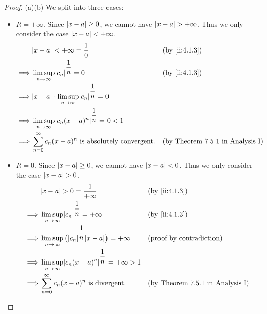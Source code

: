 \begin{proof}{(a)}{(b)}
  We split into three cases:
  \begin{itemize}
    \item \(R = +\infty\).
          Since \(\left\lvert x - a\right\rvert \geq 0\), we cannot have \(\left\lvert x - a\right\rvert > +\infty\).
          Thus we only consider the case \(\left\lvert x - a\right\rvert < +\infty\).
          \begin{align*}
                     & \abs{x - a} < +\infty = \dfrac{1}{0}                                  &  & \by{ii:4.1.3}                              \\
            \implies & \limsup_{n \to \infty} \abs{c_n}^{\dfrac{1}{n}} = 0                   &  & \by{ii:4.1.3}                              \\
            \implies & \abs{x - a} \cdot \limsup_{n \to \infty} \abs{c_n}^{\dfrac{1}{n}} = 0                                              \\
            \implies & \limsup_{n \to \infty} \abs{c_n (x - a)^n}^{\dfrac{1}{n}} = 0 < 1                                                  \\
            \implies & \sum_{n = 0}^\infty c_n (x - a)^n \text{ is absolutely convergent}.   &  & \text{(by Theorem 7.5.1 in Analysis I)}
          \end{align*}
    \item \(R = 0\).
          Since \(\left\lvert x - a\right\rvert \geq 0\), we cannot have \(\left\lvert x - a\right\rvert < 0\).
          Thus we only consider the case \(\left\lvert x - a\right\rvert > 0\).
          \begin{align*}
                     & \abs{x - a} > 0 = \dfrac{1}{+\infty}                                            &  & \by{ii:4.1.3}                              \\
            \implies & \limsup_{n \to \infty} \abs{c_n}^{\dfrac{1}{n}} = +\infty                       &  & \by{ii:4.1.3}                              \\
            \implies & \limsup_{n \to \infty} \big(\abs{c_n}^{\dfrac{1}{n}} \abs{x - a}\big) = +\infty &  & \text{(proof by contradiction)}         \\
            \implies & \limsup_{n \to \infty} \abs{c_n (x - a)^n}^{\dfrac{1}{n}} = +\infty > 1                                                      \\
            \implies & \sum_{n = 0}^\infty c_n (x - a)^n \text{ is divergent}.                         &  & \text{(by Theorem 7.5.1 in Analysis I)}
          \end{align*}

\end{itemize}
\end{proof}
